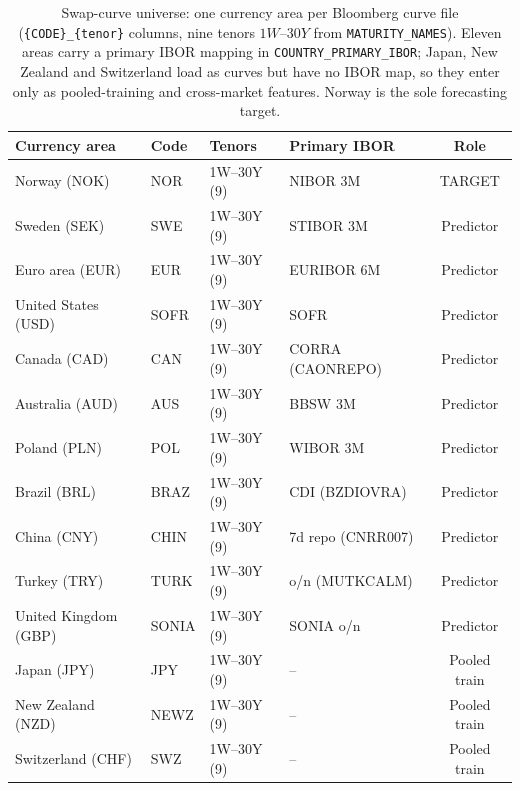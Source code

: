 \begin{table}[htbp]
\centering
\caption{Swap-curve universe: one currency area per Bloomberg curve file (\texttt{\{CODE\}\_\{tenor\}} columns, nine tenors $1W$--$30Y$ from \texttt{MATURITY\_NAMES}). Eleven areas carry a primary IBOR mapping in \texttt{COUNTRY\_PRIMARY\_IBOR}; Japan, New Zealand and Switzerland load as curves but have no IBOR map, so they enter only as pooled-training and cross-market features. Norway is the sole forecasting target.}
\label{tab:app_universe}
\footnotesize
\begin{tabular}{llllc}
\toprule
Currency area & Code & Tenors & Primary IBOR & Role \\
\midrule
Norway (NOK) & NOR & 1W--30Y (9) & NIBOR 3M & TARGET \\
Sweden (SEK) & SWE & 1W--30Y (9) & STIBOR 3M & Predictor \\
Euro area (EUR) & EUR & 1W--30Y (9) & EURIBOR 6M & Predictor \\
United States (USD) & SOFR & 1W--30Y (9) & SOFR & Predictor \\
Canada (CAD) & CAN & 1W--30Y (9) & CORRA (CAONREPO) & Predictor \\
Australia (AUD) & AUS & 1W--30Y (9) & BBSW 3M & Predictor \\
Poland (PLN) & POL & 1W--30Y (9) & WIBOR 3M & Predictor \\
Brazil (BRL) & BRAZ & 1W--30Y (9) & CDI (BZDIOVRA) & Predictor \\
China (CNY) & CHIN & 1W--30Y (9) & 7d repo (CNRR007) & Predictor \\
Turkey (TRY) & TURK & 1W--30Y (9) & o/n (MUTKCALM) & Predictor \\
United Kingdom (GBP) & SONIA & 1W--30Y (9) & SONIA o/n & Predictor \\
Japan (JPY) & JPY & 1W--30Y (9) & -- & Pooled train \\
New Zealand (NZD) & NEWZ & 1W--30Y (9) & -- & Pooled train \\
Switzerland (CHF) & SWZ & 1W--30Y (9) & -- & Pooled train \\
\bottomrule
\end{tabular}
\end{table}
